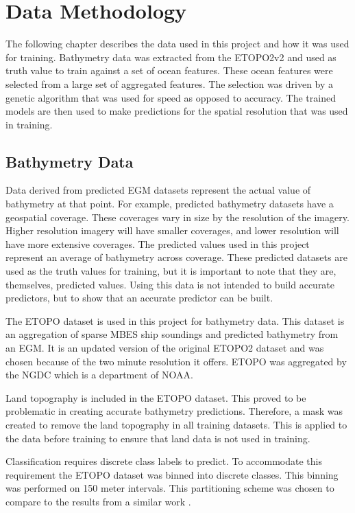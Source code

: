 \section{Data Methodology}
\setlength{\parindent}{10ex}
The following chapter describes the data used in this project and how it was used for training.
Bathymetry data was extracted from the \ac{ETOPO}2v2 and used as truth value to train against a set of ocean features.
These ocean features were selected from a large set of aggregated features.
The selection was driven by a genetic algorithm that was used for speed as opposed to accuracy.
The trained models are then used to make predictions for the spatial resolution that was used in training.

\subsection{Bathymetry Data}
Data derived from predicted \ac{EGM} datasets represent the actual value of bathymetry at that point.
For example, predicted bathymetry datasets have a geospatial coverage.
These coverages vary in size by the resolution of the imagery.
Higher resolution imagery will have smaller coverages, and lower resolution will have more extensive coverages.
The predicted values used in this project represent an average of bathymetry across coverage. 
These predicted datasets are used as the truth values for training, but it is important to note that they are, themselves, predicted values.
Using this data is not intended to build accurate predictors, but to show that an accurate predictor can be built.

\par
The \ac{ETOPO} dataset is used in this project for bathymetry data.
This dataset is an aggregation of sparse \ac{MBES} ship soundings and predicted bathymetry from an \ac{EGM}.
It is an updated version of the original ETOPO2 dataset and was chosen because of the two minute resolution it offers.
\ac{ETOPO} was aggregated by the \ac{NGDC} which is a department of \ac{NOAA}.

\par
Land topography is included in the \ac{ETOPO} dataset.
This proved to be problematic in creating accurate bathymetry predictions.
Therefore, a mask was created to remove the land topography in all training datasets.
This is applied to the data before training to ensure that land data is not used in training.

\par
Classification requires discrete class labels to predict.
To accommodate this requirement the \ac{ETOPO} dataset was binned into discrete classes.
This binning was performed on 150 meter intervals.
This partitioning scheme was chosen to compare to the results from a similar work \cite{jena2012prediction}.

